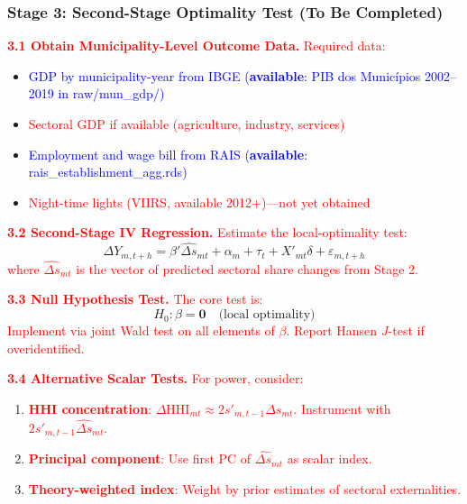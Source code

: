 \documentclass{article}
\begin{document}
\subsubsection*{Stage 3: Second-Stage Optimality Test (To Be Completed)}

\textcolor{red}{\textbf{3.1 Obtain Municipality-Level Outcome Data.} Required data:}
\begin{itemize}
    \item \textcolor{blue}{GDP by municipality-year from IBGE (\textbf{available}: PIB dos Munic\'ipios 2002--2019 in raw/mun\_gdp/)}
    \item \textcolor{red}{Sectoral GDP if available (agriculture, industry, services)}
    \item \textcolor{blue}{Employment and wage bill from RAIS (\textbf{available}: rais\_establishment\_agg.rds)}
    \item \textcolor{red}{Night-time lights (VIIRS, available 2012+)---not yet obtained}
\end{itemize}

\textcolor{red}{\textbf{3.2 Second-Stage IV Regression.} Estimate the local-optimality test:}
\begin{equation*}
    \Delta Y_{m,t+h} = \beta' \widehat{\Delta s}_{mt} + \alpha_m + \tau_t + X'_{mt}\delta + \varepsilon_{m,t+h}
\end{equation*}
\textcolor{red}{where $\widehat{\Delta s}_{mt}$ is the vector of predicted sectoral share changes from Stage 2.}

\textcolor{red}{\textbf{3.3 Null Hypothesis Test.} The core test is:}
\begin{equation*}
    H_0: \beta = \mathbf{0} \quad \text{(local optimality)}
\end{equation*}
\textcolor{red}{Implement via joint Wald test on all elements of $\beta$. Report Hansen $J$-test if overidentified.}

\textcolor{red}{\textbf{3.4 Alternative Scalar Tests.} For power, consider:}
\begin{enumerate}
    \item \textcolor{red}{\textbf{HHI concentration}: $\Delta \text{HHI}_{mt} \approx 2 s'_{m,t-1} \Delta s_{mt}$. Instrument with $2 s'_{m,t-1} \widehat{\Delta s}_{mt}$.}
    \item \textcolor{red}{\textbf{Principal component}: Use first PC of $\widehat{\Delta s}_{mt}$ as scalar index.}
    \item \textcolor{red}{\textbf{Theory-weighted index}: Weight by prior estimates of sectoral externalities.}
\end{enumerate}
\end{document}
